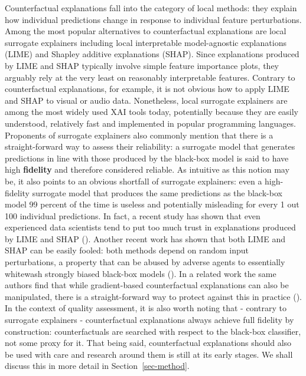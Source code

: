 \documentclass{juliacon}
\begin{document}
Counterfactual explanations fall into the category of local methods:
they explain how individual predictions change in response to individual
feature perturbations. Among the most popular alternatives to
counterfactual explanations are local surrogate explainers including
local interpretable model-agnostic explanations (LIME) and Shapley
additive explanations (SHAP). Since explanations produced by LIME and
SHAP typically involve simple feature importance plots, they arguably
rely at the very least on reasonably interpretable features. Contrary to
counterfactual explanations, for example, it is not obvious how to apply
LIME and SHAP to visual or audio data. Nonetheless, local surrogate
explainers are among the most widely used XAI tools today, potentially
because they are easily understood, relatively fast and implemented in
popular programming languages. Proponents of surrogate explainers also
commonly mention that there is a straight-forward way to assess their
reliability: a surrogate model that generates predictions in line with
those produced by the black-box model is said to have high
\textbf{fidelity} and therefore considered reliable. As intuitive as
this notion may be, it also points to an obvious shortfall of surrogate
explainers: even a high-fidelity surrogate model that produces the same
predictions as the black-box model 99 percent of the time is useless and
potentially misleading for every 1 out 100 individual predictions. In
fact, a recent study has shown that even experienced data scientists
tend to put too much trust in explanations produced by LIME and SHAP
(\cite{kaur2020interpreting}). Another recent work has shown that both
LIME and SHAP can be easily fooled: both methods depend on random input
perturbations, a property that can be abused by adverse agents to
essentially whitewash strongly biased black-box models
(\cite{slack2020fooling}). In a related work the same authors find that
while gradient-based counterfactual explanations can also be
manipulated, there is a straight-forward way to protect against this in
practice (\cite{slack2021counterfactual}). In the context of quality
assessment, it is also worth noting that - contrary to surrogate
explainers - counterfactual explanations always achieve full fidelity by
construction: counterfactuals are searched with respect to the black-box
classifier, not some proxy for it. That being said, counterfactual
explanations should also be used with care and research around them is
still at its early stages. We shall discuss this in more detail in
Section~\ref{sec-method}.
\end{document}
